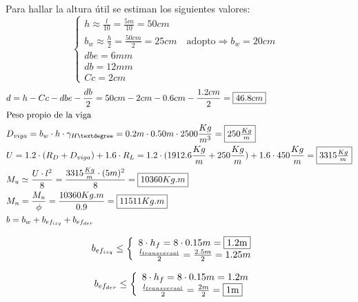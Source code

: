 \begin{enumerate}
Para hallar la altura útil se estiman los siguientes valores:\\
\[\left\{ \begin{array}{ll}
         h \approx \frac{l}{10} = \frac{5m}{10} = 50 cm & \\
         b_w \approx \frac{h}{2} = \frac{50 cm }{2} = 25 cm \quad \text{adopto} \Rightarrow b_w = 20 cm &\\
         dbe = 6 mm &\\
         db = 12 mm & \\
         Cc = 2cm & \end{array} \right. \]
\begin{align*}
& d = h - Cc - dbe - \frac{db}{2} = 50cm - 2cm -0.6cm -\frac{1.2cm}{2} = \framebox{$46.8cm$}\\
& \text{Peso propio de la viga}\\
& D_{viga}= b_w \cdot h \cdot \gamma_{H°} = 0.2m \cdot 0.50m \cdot 2500 \frac{Kg}{m^3} = \framebox{$250 \frac{Kg}{m}$}\\
& U = 1.2 \cdot (R_D+D_{viga}) + 1.6 \cdot R_L = 1.2 \cdot (1912.6 \frac{Kg}{m}+250 \frac{Kg}{m}) + 1.6 \cdot 450 \frac{Kg}{m} = \framebox{$3315 \frac{Kg}{m}$}\\
& M_u \simeq \frac{U \cdot l^2}{8} = \frac{3315 \frac{Kg}{m} \cdot (5m)^2}{8} = \framebox{$10360 Kg.m$}\\
& M_n = \frac{M_u}{\phi} = \frac{10360 Kg.m}{0.9} = \framebox{$11511 Kg.m$}\\
& b = b_w + b_{ef_{izq}} + b_{ef_{der}}
\end{align*}

\[b_{ef_{izq}} \leq \left\{ \begin{array}{ll}
         8 \cdot h_f = 8 \cdot 0.15m = \framebox{1.2m} & \\
         \frac{l_{transversal}}{2}=\frac{2.5m}{2}=1.25m & \end{array} \right. \]

\[b_{ef_{der}} \leq \left\{ \begin{array}{ll}
         8 \cdot h_f = 8 \cdot 0.15m = 1.2m & \\
         \frac{l_{transversal}}{2}=\frac{2m}{2}=\framebox{1m} & \end{array} \right. \]


\end{enumerate}
